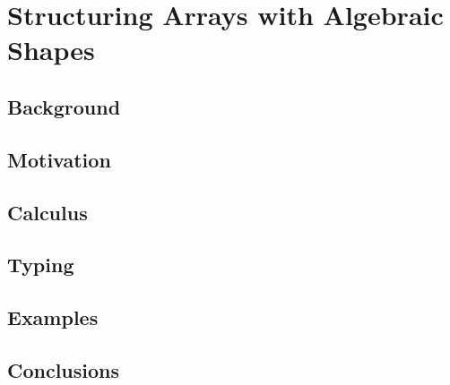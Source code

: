 \chapter{Structuring Arrays with Algebraic Shapes}
\label{star}

\section{Background}

\section{Motivation}

\section{Calculus}

\section{Typing}

\section{Examples}

\section{Conclusions}
